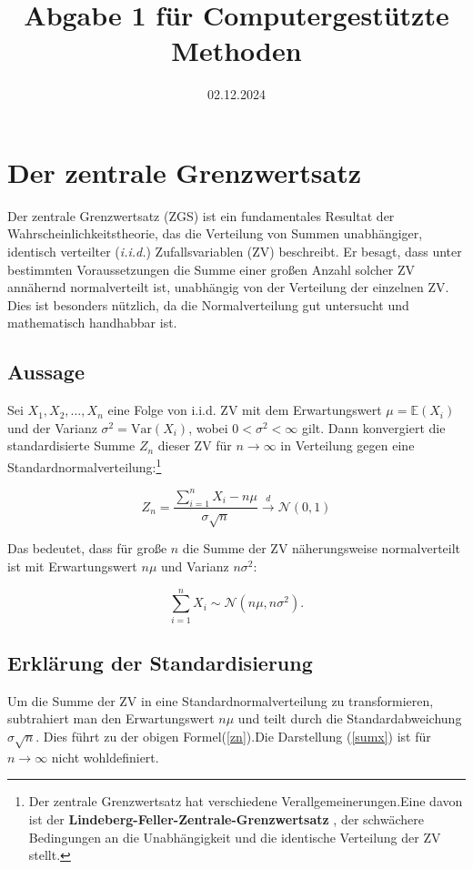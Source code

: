 \documentclass[a4paper,12pt]{article}
\title{Abgabe 1 für Computergestützte Methoden}
\author{\textcolor{red}{Gruppe 99\and 4107070 Jakob Bohn,\and 4371125 Nisa-Nur Civi,\and 4173169 Darleen Pastorik}} %
\date{02.12.2024}
\begin{document}
\maketitle
\tableofcontents

\newpage

\section{Der zentrale Grenzwertsatz}
Der zentrale Grenzwertsatz (ZGS) ist ein fundamentales Resultat der Wahrscheinlichkeitstheorie, das die Verteilung von Summen unabhängiger, identisch verteilter (\textit{i.i.d.}) Zufallsvariablen (ZV) beschreibt. Er besagt, dass unter bestimmten Voraussetzungen die Summe einer großen Anzahl solcher ZV annähernd normalverteilt ist, unabhängig von der Verteilung der einzelnen ZV. Dies ist besonders nützlich, da die Normalverteilung gut untersucht und mathematisch handhabbar ist.

\subsection{Aussage}
Sei $X_1, X_2, \dots, X_n$ eine Folge von i.i.d. ZV mit dem Erwartungswert $\mu = \mathbb{E}(X_i)$ und der Varianz $\sigma^2 = \text{Var}(X_i)$, wobei $0 < \sigma^2 < \infty$ gilt. Dann konvergiert die standardisierte Summe $Z_n$ dieser ZV für $n \to \infty$ in Verteilung gegen eine Standardnormalverteilung:\footnote{Der zentrale Grenzwertsatz hat verschiedene Verallgemeinerungen.Eine davon ist der \textbf{Lindeberg-Feller-Zentrale-Grenzwertsatz} \cite[Seite 328]{klenke2013}, der schwächere Bedingungen an die Unabhängigkeit und die identische Verteilung der ZV stellt.}

\begin{equation}
\label{zn}
Z_n = \frac{\sum_{i=1}^n X_i - n\mu}{\sigma \sqrt{n}} \xrightarrow{d} \mathcal{N}(0, 1)
\end{equation}

Das bedeutet, dass für große $n$ die Summe der ZV näherungsweise normalverteilt ist mit Erwartungswert $n\mu$ und Varianz $n\sigma^2$:

\begin{equation}
\label{sumx}
 \sum_{i=1}^n X_i \sim \mathcal{N}(n\mu, n\sigma^2).   
\end{equation}

\subsection{Erklärung der Standardisierung}
Um die Summe der ZV in eine Standardnormalverteilung zu transformieren, subtrahiert man den Erwartungswert $n\mu$ und teilt durch die Standardabweichung $\sigma \sqrt{n}$. Dies führt zu der obigen Formel(\ref{zn}).Die Darstellung (\ref{sumx}) ist für $n \to \infty$ nicht wohldefiniert.
\end{document}
